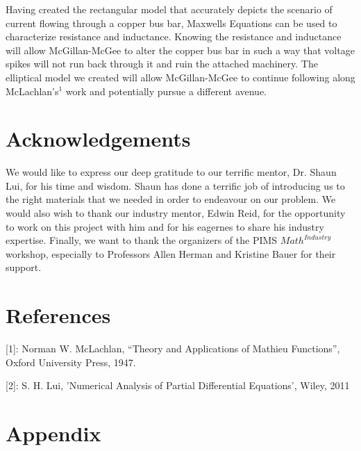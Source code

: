 \documentclass[11pt]{article}
\begin{document}
Having created the rectangular model that accurately depicts the
scenario of current flowing through a copper bus bar, Maxwells Equations
can be used to characterize resistance and inductance. Knowing the
resistance and inductance will allow McGillan-McGee to alter the copper
bus bar in such a way that voltage spikes will not run back through it
and ruin the attached machinery. The elliptical model we created will
allow McGillan-McGee to continue following along McLachlan's\(^1\) work
and potentially pursue a different avenue.

\section{Acknowledgements}

We would like to express our deep gratitude to our terrific mentor, Dr. Shaun Lui, for his time and wisdom.
Shaun has done a terrific job of introducing us to the right materials that we needed in order to endeavour on our problem.
We would also wish to thank  our industry mentor, Edwin Reid, for the opportunity to work on this project with him
and  for his eagernes to share his industry expertise. Finally, we want to thank the organizers of the PIMS $Math^{Industry}$ workshop, 
especially to Professors Allen Herman and Kristine Bauer for their support. 

\section{References}

{[}1{]}: Norman W. McLachlan, ``Theory and Applications of Mathieu
Functions'', Oxford University Press, 1947.

{[}2{]}: S. H. Lui, 'Numerical Analysis of Partial Differential Equations', Wiley, 2011

\newpage

\section{Appendix}



    
    
    
\end{document}
